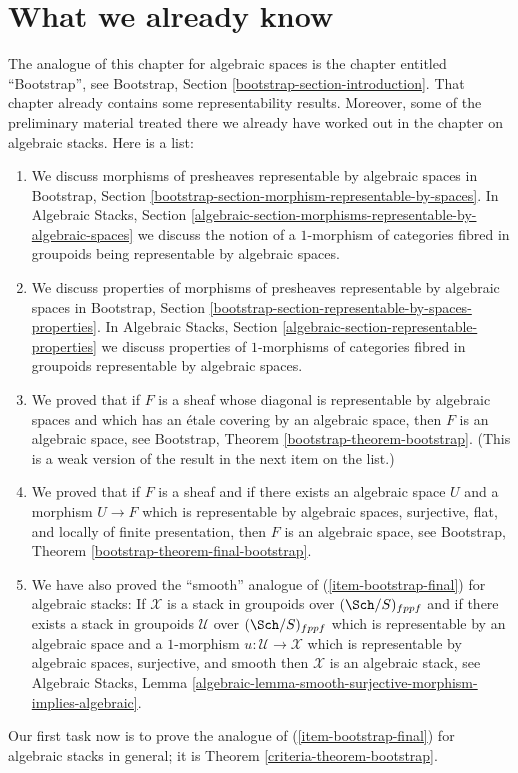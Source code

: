 \section{What we already know}
\label{criteria-section-done-so-far}
The analogue of this chapter for algebraic spaces is the chapter entitled
``Bootstrap'', see
Bootstrap, Section \ref{bootstrap-section-introduction}.
That chapter already contains some representability results.
Moreover, some of the preliminary material treated there we already
have worked out in the chapter on algebraic stacks.
Here is a list:
\begin{enumerate}
\item We discuss morphisms of presheaves representable by algebraic spaces in
Bootstrap, Section
\ref{bootstrap-section-morphism-representable-by-spaces}.
In
Algebraic Stacks, Section
\ref{algebraic-section-morphisms-representable-by-algebraic-spaces}
we discuss the notion of a $1$-morphism of categories fibred in groupoids
being representable by algebraic spaces.
\item We discuss properties of morphisms of presheaves representable by
algebraic spaces in
Bootstrap, Section
\ref{bootstrap-section-representable-by-spaces-properties}.
In
Algebraic Stacks, Section
\ref{algebraic-section-representable-properties}
we discuss properties of $1$-morphisms of categories fibred in groupoids
representable by algebraic spaces.
\item We proved that if $F$ is a sheaf whose diagonal is representable
by algebraic spaces and which has an \'etale covering by an algebraic
space, then $F$ is an algebraic space, see
Bootstrap, Theorem \ref{bootstrap-theorem-bootstrap}.
(This is a weak version of the result in the next item on the list.)
\item
\label{criteria-item-bootstrap-final}
We proved that if $F$ is a sheaf and if there exists an algebraic
space $U$ and a morphism $U \to F$ which is representable by algebraic
spaces, surjective, flat, and locally of finite presentation, then
$F$ is an algebraic space, see
Bootstrap, Theorem \ref{bootstrap-theorem-final-bootstrap}.
\item We have also proved the ``smooth'' analogue of
(\ref{item-bootstrap-final}) for algebraic
stacks: If $\mathcal{X}$ is a stack in groupoids over
$(\Sch/S)_{fppf}$ and if there exists a stack in groupoids
$\mathcal{U}$ over $(\Sch/S)_{fppf}$ which is representable
by an algebraic space and a $1$-morphism $u : \mathcal{U} \to \mathcal{X}$
which is representable by algebraic spaces, surjective, and smooth
then $\mathcal{X}$ is an algebraic stack, see
Algebraic Stacks, Lemma
\ref{algebraic-lemma-smooth-surjective-morphism-implies-algebraic}.
\end{enumerate}
Our first task now is to prove the analogue of
(\ref{item-bootstrap-final}) for algebraic
stacks in general; it is
Theorem \ref{criteria-theorem-bootstrap}.

